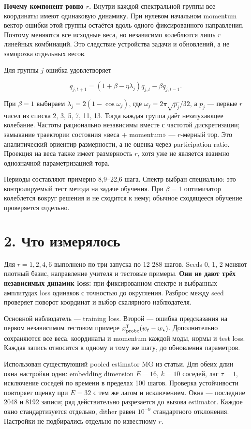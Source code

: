 \documentclass[10pt,a4paper]{article}
\begin{document}
\textbf{Почему компонент ровно $r$.} Внутри каждой спектральной группы все координаты имеют одинаковую динамику. При нулевом начальном momentum вектор ошибки этой группы остаётся вдоль одного фиксированного направления. Поэтому меняются все исходные веса, но независимо колеблются лишь $r$ линейных комбинаций. Это следствие устройства задачи и обновлений, а не заморозка отдельных весов.

Для группы $j$ ошибка удовлетворяет

\[
q_{j,t+1}=(1+\beta-\eta\lambda_j)q_{j,t}-\beta q_{j,t-1}.
\]

При $\beta=1$ выбираем $\lambda_j=2(1-\cos\omega_j)$, где $\omega_j=2\pi\sqrt{p_j}/32$, а $p_j$ --- первые $r$ чисел из списка 2, 3, 5, 7, 11, 13. Тогда каждая группа даёт незатухающее колебание. Частоты рационально независимы вместе с частотой дискретизации; замыкание траектории состояния «веса + momentum» --- $r$-мерный тор. Это аналитический ориентир размерности, а не оценка через participation ratio. Проекция на веса также имеет размерность $r$, хотя уже не является взаимно однозначной параметризацией тора.

Периоды составляют примерно 8,9–22,6 шага. Спектр выбран специально: это контролируемый тест метода на задаче обучения. При $\beta=1$ оптимизатор колеблется вокруг решения и не сходится к нему; обычное сходящееся обучение проверяется отдельно.

\section*{2. Что измерялось}

Для $r=1,2,4,6$ выполнено по три запуска по 12 288 шагов. Seeds 0, 1, 2 меняют плотный базис, направление учителя и тестовые примеры. \textbf{Они не дают трёх независимых динамик loss:} при фиксированном спектре и выбранных амплитудах loss одинаков с точностью до округления. Разброс между seed проверяет поворот координат и выбор скалярного наблюдателя.

Основной наблюдатель --- training loss. Второй --- ошибка предсказания на первом независимом тестовом примере $x_{\rm probe}^{\mathsf T}(w_t-w_\star)$. Дополнительно сохраняются все веса, координаты и momentum каждой моды, нормы и test loss. Каждая запись относится к одному и тому же шагу, до обновления параметров.

Использован существующий pooled estimator MG из статьи. Для обеих длин окна настройки одни: embedding dimension $E=16$, $k=10$ соседей, лаг $\tau=1$, исключение соседей по времени в пределах 100 шагов. Проверка устойчивости повторяет оценку при $E=32$ с тем же лагом и исключением. Окна --- последние 2048 и 8192 записи; ряд действительно разрезается до вызова estimator. Каждое окно стандартизуется отдельно, dither равен $10^{-9}$ стандартного отклонения. Настройки не подбирались отдельно по известному $r$.
\end{document}
